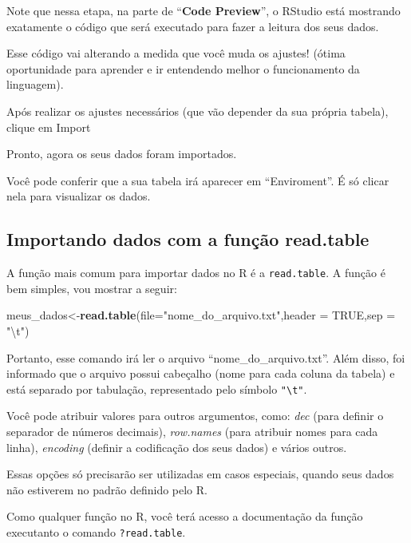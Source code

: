 \documentclass[
]{book}
\newenvironment{Shaded}{\begin{snugshade}}{\end{snugshade}}
\newcommand{\CharTok}[1]{\textcolor[rgb]{0.31,0.60,0.02}{#1}}
\newcommand{\DataTypeTok}[1]{\textcolor[rgb]{0.13,0.29,0.53}{#1}}
\newcommand{\KeywordTok}[1]{\textcolor[rgb]{0.13,0.29,0.53}{\textbf{#1}}}
\newcommand{\NormalTok}[1]{#1}
\newcommand{\OtherTok}[1]{\textcolor[rgb]{0.56,0.35,0.01}{#1}}
\newcommand{\StringTok}[1]{\textcolor[rgb]{0.31,0.60,0.02}{#1}}
\begin{document}
Note que nessa etapa, na parte de ``\textbf{Code Preview}'', o RStudio
está mostrando exatamente o código que será executado para fazer a
leitura dos seus dados.

Esse código vai alterando a medida que você muda os ajustes! (ótima
oportunidade para aprender e ir entendendo melhor o funcionamento da
linguagem).

Após realizar os ajustes necessários (que vão depender da sua própria
tabela), clique em Import

Pronto, agora os seus dados foram importados.

Você pode conferir que a sua tabela irá aparecer em ``Enviroment''. É só
clicar nela para visualizar os dados.

\hypertarget{importando-dados-com-a-funuxe7uxe3o-read.table}{%
\subsection{Importando dados com a função
read.table}\label{importando-dados-com-a-funuxe7uxe3o-read.table}}

A função mais comum para importar dados no R é a \texttt{read.table}. A
função é bem simples, vou mostrar a seguir:

\begin{Shaded}
\begin{Highlighting}[]
\NormalTok{meus_dados<-}\KeywordTok{read.table}\NormalTok{(}\DataTypeTok{file=}\StringTok{"nome_do_arquivo.txt"}\NormalTok{,}\DataTypeTok{header =} \OtherTok{TRUE}\NormalTok{,}\DataTypeTok{sep =} \StringTok{"}\CharTok{\textbackslash{}t}\StringTok{"}\NormalTok{)}
\end{Highlighting}
\end{Shaded}

Portanto, esse comando irá ler o arquivo ``nome\_do\_arquivo.txt''. Além
disso, foi informado que o arquivo possui cabeçalho (nome para cada
coluna da tabela) e está separado por tabulação, representado pelo
símbolo \texttt{"\textbackslash{}t"}.

Você pode atribuir valores para outros argumentos, como: \emph{dec}
(para definir o separador de números decimais), \emph{row.names} (para
atribuir nomes para cada linha), \emph{encoding} (definir a codificação
dos seus dados) e vários outros.

Essas opções só precisarão ser utilizadas em casos especiais, quando
seus dados não estiverem no padrão definido pelo R.

Como qualquer função no R, você terá acesso a documentação da função
executanto o comando \texttt{?read.table}.
\end{document}
